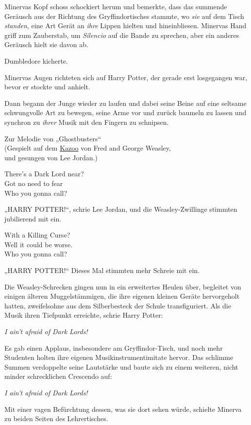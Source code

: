 {Minervas Kopf schoss schockiert herum und bemerkte, dass das summende Geräusch aus der Richtung des Gryffindortisches stammte, wo \emph{sie} auf dem Tisch \emph{standen}, eine Art Gerät an \emph{ihre} Lippen hielten und hineinbliesen. Minervas Hand griff zum Zauberstab, um \emph{Silencio} auf die Bande zu sprechen, aber ein anderes Geräusch hielt sie davon ab.

Dumbledore kicherte.

Minervas Augen richteten sich auf Harry Potter, der gerade erst losgegangen war, bevor er stockte und anhielt.

Dann begann der Junge wieder zu laufen und dabei seine Beine auf eine seltsame schwungvolle Art zu bewegen, seine Arme vor und zurück baumeln zu lassen und synchron zu \emph{ihrer} Musik mit den Fingern zu schnipsen.

Zur Melodie von „Ghostbusters“\\ (Gespielt auf dem \href{http://de.\%20wikipedia.\%20org/wiki/Kazoo“\%20target=}{Kazoo} von Fred and George Weasley,\\ und gesungen von Lee Jordan.)

There's a Dark Lord near?\\ Got no need to fear\\ Who you gonna call?

„HARRY POTTER!“, schrie Lee Jordan, und die Weasley-Zwillinge stimmten jubilierend mit ein.

With a Killing Curse?\\ Well it could be worse.\\ Who you gonna call?

„HARRY POTTER!“ Dieses Mal stimmten mehr Schreie mit ein.

Die Weasley-Schrecken gingen nun in ein erweitertes Heulen über, begleitet von einigen älteren Muggelstämmigen, die ihre eigenen kleinen Geräte hervorgeholt hatten, zweifelsohne aus dem Silberbesteck der Schule transfiguriert. Als die Musik ihren Tiefpunkt erreichte, schrie Harry Potter:

\emph{I ain't afraid of Dark Lords!}

Es gab einen Applaus, insbesondere am Gryffindor-Tisch, und noch mehr Studenten holten ihre eigenen Musikinstrumentimitate hervor. Das schlimme Summen verdoppelte seine Lautstärke und baute sich zu einem weiteren, nicht minder schrecklichen Crescendo auf:

\emph{I ain't afraid of Dark Lords!}

Mit einer vagen Befürchtung dessen, was sie dort sehen würde, schielte Minerva zu beiden Seiten des Lehrertisches.

}

